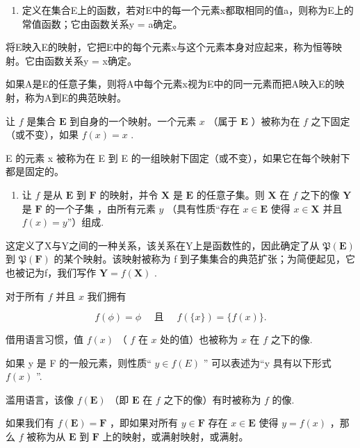 \begin{enumerate}
\def\labelenumi{\arabic{enumi}.}
\setcounter{enumi}{2}
\tightlist
\item
  定义在集合E上的函数，若对E中的每一个元素x都取相同的值a，则称为E上的常值函数；它由函数关系y = a确定。
\end{enumerate}

将E映入E的映射，它把E中的每个元素x与这个元素本身对应起来，称为恒等映射。它由函数关系y = x确定。

如果A是E的任意子集，则将A中每个元素x视为E中的同一元素而把A映入E的映射，称为A到E的典范映射。

让 \(f\) 是集合 \(\mathbf{E}\) 到自身的一个映射。一个元素 \(x\) （属于 \(\mathbf{E}\) ）被称为在 \(f\) 之下固定（或不变），如果 \(f(x) = x\) .

E 的元素 x 被称为在 E 到 E 的一组映射下固定（或不变），如果它在每个映射下都是固定的。

\begin{enumerate}
\def\labelenumi{\arabic{enumi}.}
\setcounter{enumi}{3}
\tightlist
\item
  让 \(f\) 是从 \(\mathbf{E}\) 到 \(\mathbf{F}\) 的映射，并令 \(\mathbf{X}\) 是 \(\mathbf{E}\) 的任意子集。则 \(\mathbf{X}\) 在 \(f\) 之下的像 \(\mathbf{Y}\) 是 \(\mathbf{F}\) 的一个子集 ，由所有元素 \(y\) （具有性质“存在 \(x \in \mathbf{E}\) 使得 \(x \in \mathbf{X}\) 并且 \(f(x) = y\)”）组成.
\end{enumerate}

这定义了X与Y之间的一种关系，该关系在Y上是函数性的，因此确定了从 \(\mathfrak{P}(\mathbf{E})\) 到 \(\mathfrak{P}(\mathbf{F})\) 的某个映射。该映射被称为 f 到子集集合的典范扩张；为简便起见，它也被记为f，我们写作 \(\mathbf{Y}=f(\mathbf{X})\) .

对于所有 \(f\) 并且 \(x\) 我们拥有

\[
f (\phi) = \phi \quad \text { 且 } \quad f (\{x \}) = \{f (x) \}.
\]

借用语言习惯，值 \(f(x)\) （ \(f\) 在 \(x\) 处的值）也被称为 \(x\) 在 \(f\) 之下的像.

如果 y 是 F 的一般元素，则性质“ \(y \in f(E)\) '' 可以表述为“y 具有以下形式 \(f(x)\) ''.

滥用语言，该像 \(f(\mathbf{E})\) （即 \(\mathbf{E}\) 在 \(f\) 之下的像）有时被称为 \(f\) 的像.

如果我们有 \(f(\mathbf{E}) = \mathbf{F}\) ，即如果对所有 \(y \in \mathbf{F}\) 存在 \(x \in \mathbf{E}\) 使得 \(y = f(x)\) ，那么 \(f\) 被称为从 \(\mathbf{E}\) 到 \(\mathbf{F}\) 上的映射，或满射映射，或满射。


